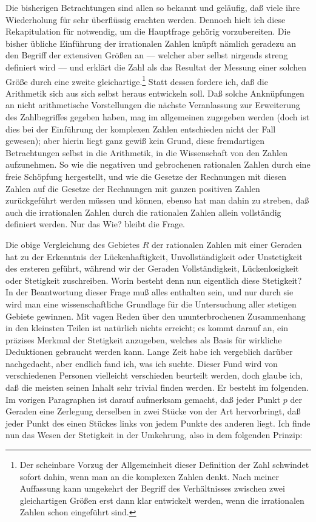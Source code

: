 \documentclass[11pt]{article}
\begin{document}
Die bisherigen Betrachtungen sind allen so bekannt und geläufig, daß viele ihre Wiederholung für sehr überflüssig erachten werden. Dennoch hielt ich diese Rekapitulation für notwendig, um die Hauptfrage gehörig vorzubereiten. Die bisher übliche Einführung der irrationalen Zahlen knüpft nämlich geradezu an den Begriff der extensiven Größen an — welcher aber selbst nirgends streng definiert wird — und erklärt die Zahl als das Resultat der Messung einer solchen Größe durch eine zweite gleichartige.\footnote{Der scheinbare Vorzug der Allgemeinheit dieser Definition der Zahl schwindet sofort dahin, wenn man an die komplexen Zahlen denkt. Nach meiner Auffassung kann umgekehrt der Begriff des Verhältnisses zwischen zwei gleichartigen Größen erst dann klar entwickelt werden, wenn die irrationalen Zahlen schon eingeführt sind.} Statt dessen fordere ich, daß die Arithmetik sich aus sich selbst heraus entwickeln soll. Daß solche Anknüpfungen an nicht arithmetische Vorstellungen die nächste Veranlassung zur Erweiterung des Zahlbegriffes gegeben haben, mag im allgemeinen zugegeben werden (doch ist dies bei der Einführung der komplexen Zahlen entschieden nicht der Fall gewesen); aber hierin liegt ganz gewiß kein Grund, diese fremdartigen Betrachtungen selbst in die Arithmetik, in die Wissenschaft von den Zahlen aufzunehmen. So wie die negativen und gebrochenen rationalen Zahlen durch eine freie Schöpfung hergestellt, und wie die Gesetze der Rechnungen mit diesen Zahlen auf die Gesetze der Rechnungen mit ganzen positiven Zahlen zurückgeführt werden müssen und können, ebenso hat man dahin zu streben, daß auch die irrationalen Zahlen durch die rationalen Zahlen allein vollständig definiert werden. Nur das Wie? bleibt die Frage.

Die obige Vergleichung des Gebietes $R$ der rationalen Zahlen mit einer Geraden hat zu der Erkenntnis der Lückenhaftigkeit, Unvollständigkeit oder Unstetigkeit des ersteren geführt, während wir der Geraden Vollständigkeit, Lückenlosigkeit oder Stetigkeit zuschreiben. Worin besteht denn nun eigentlich diese Stetigkeit? In der Beantwortung dieser Frage muß alles enthalten sein, und nur durch sie wird man eine wissenschaftliche Grundlage für die Untersuchung aller stetigen Gebiete gewinnen. Mit vagen Reden über den ununterbrochenen Zusammenhang in den kleinsten Teilen ist natürlich nichts erreicht; es kommt darauf an, ein präzises Merkmal der Stetigkeit anzugeben, welches als Basis für wirkliche Deduktionen gebraucht werden kann. Lange Zeit habe ich vergeblich darüber nachgedacht, aber endlich fand ich, was ich suchte. Dieser Fund wird von verschiedenen Personen vielleicht verschieden beurteilt werden, doch glaube ich, daß die meisten seinen Inhalt sehr trivial finden werden. Er besteht im folgenden. Im vorigen Paragraphen ist darauf aufmerksam gemacht, daß jeder Punkt $p$ der Geraden eine Zerlegung derselben in zwei Stücke von der Art hervorbringt, daß jeder Punkt des einen Stückes links von jedem Punkte des anderen liegt. Ich finde nun das Wesen der Stetigkeit in der Umkehrung, also in dem folgenden Prinzip:
\end{document}

